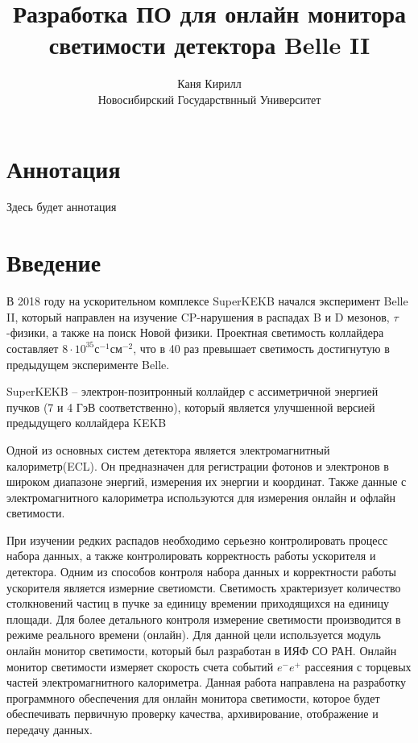 \documentclass[a4paper, 12pt]{article}
\title{Разработка ПО для онлайн монитора светимости детектора Belle II}
\author{Каня Кирилл\\Новосибирский Государствнный Университет}
\begin{document}
\maketitle
\newpage

\section*{Аннотация}
Здесь будет аннотация
\newpage

\tableofcontents
\newpage

\section{Введение}
  В 2018 году на ускорительном комплексе SuperKEKB начался эксперимент Belle II, который направлен на изучение CP-нарушения в распадах B и D мезонов, $\tau$-физики, а также на поиск Новой физики. Проектная светимость коллайдера составляет $8\cdot10^{35}$с$^{-1}$см$^{-2}$, что в 40 раз превышает светимость достигнутую в предыдущем эксперименте Belle.\par
  SuperKEKB -- электрон-позитронный коллайдер с ассиметричной энергией пучков (7 и 4 ГэВ соответственно), который является улучшенной версией предыдущего коллайдера KEKB\par
  Одной из основных систем детектора является электромагнитный калориметр(ECL). Он предназначен для регистрации фотонов и электронов в широком диапазоне энергий, измерения их энергии и координат. Также данные с электромагнитного калориметра используются для измерения онлайн и офлайн светимости.\par
  При изучении редких распадов необходимо серьезно контролировать процесс набора данных, а также контролировать корректность работы ускорителя и детектора. Одним из способов контроля набора данных и корректности работы ускорителя является измерние светиомсти. Светимость храктеризует количество столкновений частиц в пучке за единицу времении приходящихся на единицу площади. Для более детального контроля измерение светимости производится в режиме реального времени (онлайн). Для данной цели используется модуль онлайн монитор светимости, который был разработан в ИЯФ СО РАН. Онлайн монитор светимости измеряет скорость счета событий $e^-e^+$ рассеяния с торцевых частей электромагнитного калориметра. Данная работа направлена на разработку программного обеспечения для онлайн монитора светимости, которое будет обеспечивать первичную проверку качества, архивирование, отображение и передачу данных.\par
\newpage
\end{document}
